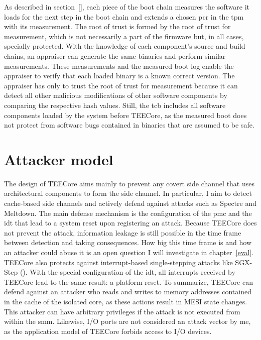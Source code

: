 As described in section~\ref{}, each
piece of the boot chain measures the software it loads for the next step in the
boot chain and extends a chosen \gls{pcr} in the \gls{tpm} with its measurement.
The root of trust is formed by the root of trust for measurement, which is not
necessarily a part of the firmware but, in all cases, specially protected. With
the knowledge of each component's source and build chains, an appraiser can
generate the same binaries and perform similar measurements. These measurements
and the measured boot log enable the appraiser to verify that each loaded binary
is a known correct version. The appraiser has only to trust the root of trust
for measurement because it can detect all other malicious modifications of other
software components by comparing the respective hash values. Still, the
\gls{tcb} includes all software components loaded by the system before TEECore,
as the measured boot does not protect from software bugs contained in binaries
that are assumed to be safe.

\section{Attacker model}
\label{sec:30:tee_attacker_model}
The design of TEECore aims mainly to prevent any covert
side channel that uses architectural components to form the side channel. In
particular, I aim to detect cache-based side channels and actively defend
against attacks such as Spectre and Meltdown. The main defense mechanism is the
configuration of the \gls{pmc} and the \gls{idt} that lead to a system reset
upon registering an attack. Because TEECore does not prevent the attack,
information leakage is still possible in the time frame between detection and
taking consequences. How big this time frame is and how an attacker could abuse
it is an open question I will investigate in chapter~\ref{eval}. TEECore also protects against interrupt-based single-stepping
attacks like SGX-Step (). With the special
configuration of the \gls{idt}, all interrupts received by TEECore lead to the
same result: a platform reset. To summarize, TEECore can defend against an
attacker who reads and writes to memory addresses contained in the cache of the
isolated core, as these actions result in MESI state changes. This attacker can
have arbitrary privileges if the attack is not executed from within the
\gls{smm}. Likewise, I/O ports are not considered an attack vector by me, as the
application model of TEECore forbids access to I/O devices. \\


